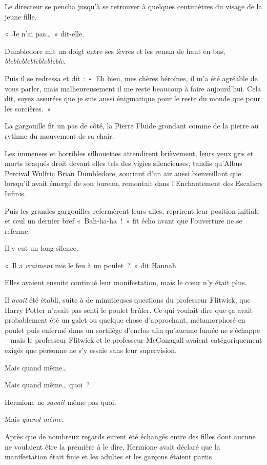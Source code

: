Le directeur se pencha jusqu'à se retrouver à quelques centimètres du visage de la jeune fille.

«~Je n'ai pas…~»
dit-elle.

Dumbledore mit un doigt entre ses lèvres et les remua de haut en bas, \emph{blebleblebleblebleble}.

Puis il se redressa et dit~: «~Eh bien, mes chères héroïnes, il m'a été agréable de vous parler, mais malheureusement il me reste beaucoup à faire aujourd'hui.
Cela dit, soyez assurées que je suis aussi énigmatique pour le reste du monde que pour les sorcières.~»

La gargouille fit un pas de côté, la Pierre Fluide grondant comme de la pierre au rythme du mouvement de sa chair.

Les immenses et horribles silhouettes attendirent brièvement, leurs yeux gris et morts braqués droit devant elles tels des vigies silencieuses, tandis qu'Albus Percival Wulfric Brian Dumbledore, souriant d'un air aussi bienveillant que lorsqu'il avait émergé de son bureau, remontait dans l'Enchantement des Escaliers Infinis.

Puis les grandes gargouilles refermèrent leurs ailes, reprirent leur position initiale et seul un dernier bref «~Bah-ha-ha~!~»
fit écho avant que l'ouverture ne se referme.

Il y eut un long silence.

«~Il a \emph{vraiment} mis le feu à un poulet~?~»
dit Hannah.

\later

Elles avaient ensuite continué leur manifestation, mais le cœur n'y était plus.

Il \emph{avait} été établi, suite à de minutieuses questions du professeur Flitwick, que Harry Potter n'avait pas senti le poulet brûler.
Ce qui voulait dire que ça avait probablement été un galet ou quelque chose d'approchant, métamorphosé en poulet puis enfermé dans un sortilège d'enclos afin qu'aucune fumée ne s'échappe -- mais le professeur Flitwick et le professeur McGonagall avaient catégoriquement exigés que personne ne s'y essaie sans leur supervision.

Mais quand même…

Mais quand même… quoi~?

Hermione ne \emph{savait} même pas quoi.

Mais \emph{quand même}.

Après que de nombreux regards eurent été échangés entre des filles dont aucune ne voulaient être la première à le dire, Hermione avait déclaré que la manifestation était finie et les adultes et les garçons étaient partis.

